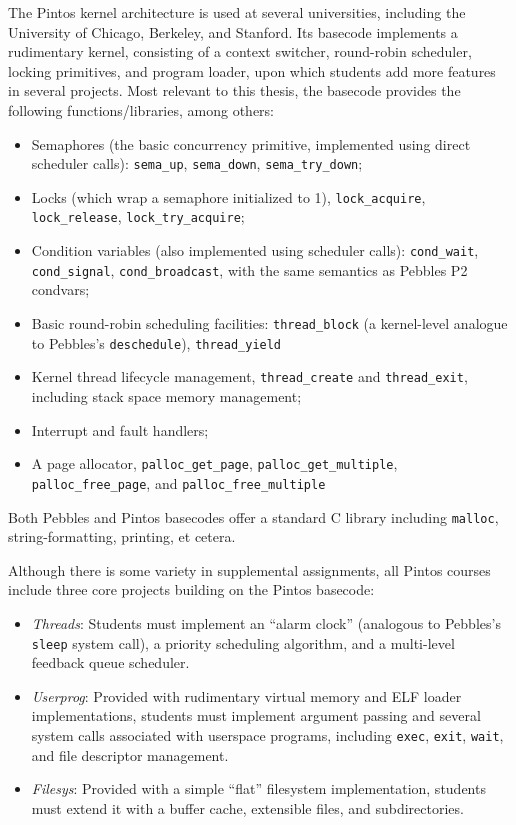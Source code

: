 The Pintos kernel architecture \cite{pintos} is used at several universities, including the University of Chicago, Berkeley, and Stanford.
Its basecode implements a rudimentary kernel, consisting of a context switcher, round-robin scheduler, locking primitives, and program loader,
upon which students add more features in several projects.
Most relevant to this thesis, the basecode provides the following functions/libraries, among others:
\begin{itemize}
	\item Semaphores (the basic concurrency primitive, implemented using direct scheduler calls): {\tt sema\_up}, {\tt sema\_down}, {\tt sema\_try\_down};
	\item Locks (which wrap a semaphore initialized to 1), {\tt lock\_acquire}, {\tt lock\_\allowbreak{}release}, {\tt lock\_try\_acquire};
	\item Condition variables (also implemented using scheduler calls): {\tt cond\_wait}, {\tt cond\_\allowbreak{}signal}, {\tt cond\_broadcast}, with the same semantics as Pebbles P2 condvars;
	\item Basic round-robin scheduling facilities: {\tt thread\_block} (a kernel-level analogue to Pebbles's {\tt deschedule}), {\tt thread\_yield}
	\item Kernel thread lifecycle management, {\tt thread\_create} and {\tt thread\_exit}, including stack space memory management;
	\item Interrupt and fault handlers;
	\item A page allocator, {\tt palloc\_get\_page}, {\tt palloc\_get\_multiple}, {\tt palloc\_free\_page}, and {\tt palloc\_free\_multiple}
\end{itemize}
Both Pebbles and Pintos basecodes offer a standard C library including {\tt malloc}, string-formatting, printing, et cetera.

Although there is some variety in supplemental assignments, all Pintos courses include three core projects building on the Pintos basecode:
\begin{itemize}
	\item {\em Threads}: Students must implement an ``alarm clock'' (analogous to Pebbles's {\tt sleep} system call),
		a priority scheduling algorithm, and a multi-level feedback queue scheduler.
	\item {\em Userprog}: Provided with rudimentary virtual memory and ELF loader implementations, students must implement argument passing and several system calls associated with userspace programs, including {\tt exec}, {\tt exit}, {\tt wait}, and file descriptor management.
	\item {\em Filesys}: Provided with a simple ``flat'' filesystem implementation, students must extend it with a buffer cache, extensible files, and subdirectories.
\end{itemize}

